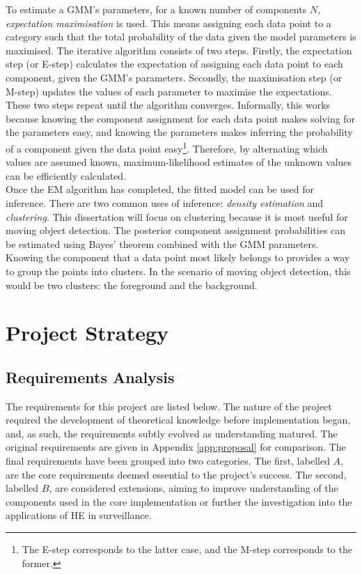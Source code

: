 To estimate a GMM's parameters, for a known number of components $N$, \textit{expectation maximisation} is used. This means assigning each data point to a category such that the total probability of the data given the model parameters is maximised. The iterative algorithm consists of two steps. Firstly, the expectation step (or E-step) calculates the expectation of assigning each data point to each component, given the GMM's parameters. Secondly, the maximisation step (or M-step) updates the values of each parameter to maximise the expectations. These two steps repeat until the algorithm converges. Informally, this works because knowing the component assignment for each data point makes solving for the parameters easy, and knowing the parameters makes inferring the probability of a component given the data point easy\footnote{The E-step corresponds to the latter case, and the M-step corresponds to the former.}. Therefore, by alternating which values are assumed known, maximum-likelihood estimates of the unknown values can be efficiently calculated.
\smallskip \\ \indent
Once the EM algorithm has completed, the fitted model can be used for inference. There are two common uses of inference: \textit{density estimation} and \textit{clustering}. This dissertation will focus on clustering because it is most useful for moving object detection. The posterior component assignment probabilities can be estimated using Bayes' theorem combined with the GMM parameters. Knowing the component that a data point most likely belongs to provides a way to group the points into clusters. In the scenario of moving object detection, this would be two clusters: the foreground and the background.

\setlength{\leftskip}{0cm}





\section{Project Strategy}
\label{sec:projectStrategy}

\subsection{Requirements Analysis}
\label{sec:requirements}
\setlength{\leftskip}{0.5cm}
\indent \indent
The requirements for this project are listed below. The nature of the project required the development of theoretical knowledge before implementation began, and, as such, the requirements subtly evolved as understanding matured. The original requirements are given in Appendix \ref{app:proposal} for comparison. The final requirements have been grouped into two categories. The first, labelled $A$, are the core requirements deemed essential to the project's success. The second, labelled $B$, are considered extensions, aiming to improve understanding of the components used in the core implementation or further the investigation into the applications of HE in surveillance.
